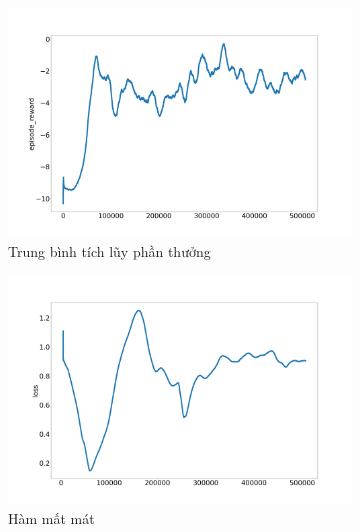 \begin{figure}[ht]
    \centering
    \begin{subfigure}{.5\textwidth}
      \includegraphics[width=1.1\textwidth]{Pic/Second_model/episode_reward.png}  
      \caption{Trung bình tích lũy phần thưởng}
      \label{fig:resut_second_model:avg}
    \end{subfigure}%
    \begin{subfigure}{.5\textwidth}
      \includegraphics[width=1.1\textwidth]{Pic/Second_model/loss.png}  
      \caption{Hàm mất mát}
      \label{fig:resut_second_model:loss}
    \end{subfigure}\\
    \vspace{1cm}
    \begin{subfigure}{.5\textwidth}

\end{subfigure}
\end{figure}
